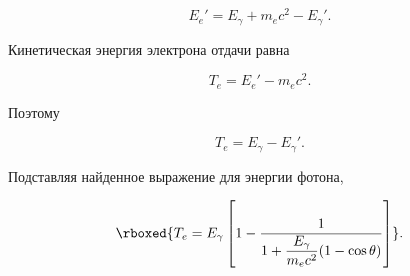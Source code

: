 \documentclass[../final.tex]{subfiles}
\begin{document}
\begin{equation*}
    E_e'
    =
    E_\gamma
    +
    m_ec^2
    -
    E_\gamma'.
\end{equation*}

Кинетическая энергия электрона отдачи равна

\begin{equation*}
    T_e
    =
    E_e'-m_ec^2.
\end{equation*}

Поэтому

\begin{equation*}
    T_e
    =
    E_\gamma-E_\gamma'.
\end{equation*}

Подставляя найденное выражение для энергии фотона,

\begin{equation*}
    \rboxed{
        T_e
        =
        E_\gamma
        \left[
            1-
            \frac{
                1
            }{
                1+
                \dfrac{
                    E_\gamma
                }{
                    m_ec^2
                }
                (1-\cos\theta)
            }
        \right]
    }.
\end{equation*}
\end{document}
